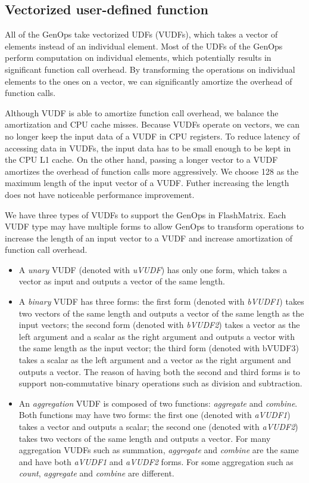 \subsection{Vectorized user-defined function}
All of the GenOps take vectorized UDFs (VUDFs), which takes a vector of
elements instead of an individual element. Most of the UDFs of the GenOps
perform computation on individual elements, which potentially results in
significant function call overhead. By transforming the operations on
individual elements to the ones on a vector, we can significantly amortize
the overhead of function calls.

Although VUDF is able to amortize function call overhead, we balance
the amortization and CPU cache
misses. Because VUDFs operate on vectors, we can no longer keep the input data
of a VUDF in CPU registers. To reduce latency of accessing data in VUDFs,
the input data has to be small enough to be kept in the CPU L1 cache. On the
other hand, passing a longer vector to a VUDF amortizes the overhead of
function calls more aggressively. We choose 128 as the maximum length of
the input vector of a VUDF.
Futher increasing the length does not have noticeable performance improvement.

We have three types of VUDFs to support the GenOps in FlashMatrix. Each VUDF
type may have multiple forms to allow GenOps to transform operations to
increase the length of an input vector to a VUDF and increase amortization
of function call overhead.
\begin{itemize}
	\item A \textit{unary} VUDF (denoted with \textit{uVUDF}) has only one form,
		which takes a vector as input and outputs a vector of the same length.
	\item A \textit{binary} VUDF has three forms: the first form (denoted with
		\textit{bVUDF1}) takes two vectors of the same length and outputs
		a vector of the same length as the input vectors; the second form (denoted
		with \textit{bVUDF2}) takes a vector as the left argument and a scalar
		as the right argument and outputs a vector with the same length as
		the input vector; the third form (denoted with bVUDF3) takes a scalar
		as the left argument and a vector as the right argument and outputs
		a vector. The reason of having both the second and third forms is to
		support non-commutative binary operations such as division and subtraction.
	\item An \textit{aggregation} VUDF is composed of two functions:
		\textit{aggregate} and \textit{combine}. Both functions may have two
		forms: the first one (denoted with \textit{aVUDF1}) takes a vector and
		outputs a scalar; the second one (denoted with \textit{aVUDF2}) takes
		two vectors of the same length and outputs a vector. For many
		aggregation VUDFs such as summation, \textit{aggregate} and
		\textit{combine} are the same and have both \textit{aVUDF1} and
		\textit{aVUDF2} forms. For some aggregation such as \textit{count},
		\textit{aggregate} and \textit{combine} are different.
\end{itemize}

